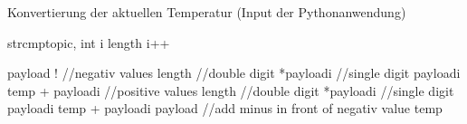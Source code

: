 \documentclass[a4paper,11pt,openany,oneside,ngerman]{sphinxmanual}
\begin{document}
Konvertierung der aktuellen Temperatur (Input der Pythonanwendung)

\begin{sphinxVerbatim}[commandchars=\\\{\}]
strcmptopic,    
     int    i \PYGZlt{} length i++ 

        payload\PYG{o}{[}\PYG{o}{]} !                 //negativ values
              length \PYGZgt{}            //double digit
                  *payload\PYG{o}{[}i\PYG{o}{]}\PYGZhy{}
                                 //single digit
                  payload\PYG{o}{[}i\PYG{o}{]}\PYGZhy{}
                  temp + payload\PYG{o}{[}i\PYG{o}{]}\PYGZhy{}
                                         //positive values
              length \PYGZgt{}            //double digit
                  *payload\PYG{o}{[}i\PYG{o}{]}\PYGZhy{}
                                 //single digit
                  payload\PYG{o}{[}i\PYG{o}{]}\PYGZhy{}
                  temp + payload\PYG{o}{[}i\PYG{o}{]}\PYGZhy{}
    payload\PYG{o}{[}\PYG{o}{]}                      //add minus in front of negativ value
          \PYGZhy{}temp
\end{sphinxVerbatim}
\end{document}
